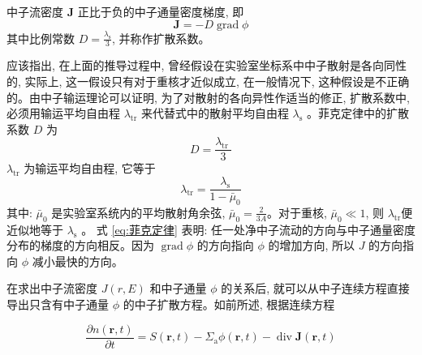 \documentclass{Sichuan Normal University}
\begin{document}
\begin{theorem}[菲克定律]
    中子流密度 $\boldsymbol{J}$ 正比于负的中子通量密度梯度, 即
    \begin{equation}
    \boldsymbol{J}=-D \operatorname{grad} \phi
    \label{eq:菲克定律}
\end{equation}
    其中比例常数 $D=\frac{\lambda_{\mathrm{s}}}{3}$, 并称作扩散系数。
\end{theorem}

应该指出, 在上面的推导过程中, 曾经假设在实验室坐标系中中子散射是各向同性的, 实际上, 这一假设只有对于重核才近似成立, 在一般情况下, 这种假设是不正确的。由中子输运理论可以证明, 为了对散射的各向异性作适当的修正, 扩散系数中, 必须用输运平均自由程 $\lambda_{\mathrm{tr}}$ 来代替式中的散射平均自由程 $\lambda_{\mathrm{s}}$ 。菲克定律中的扩散系数 $D$ 为
\begin{equation}
    D=\frac{\lambda_{\text {tr }}}{3}
    \label{eq:扩散系数}
\end{equation}
    $\lambda_{\mathrm{tr}}$ 为输运平均自由程, 它等于
\begin{equation}
    \lambda_{\mathrm{tr}}=\frac{\lambda_{\mathrm{s}}}{1-\bar{\mu}_0}
    \label{eq:输运平均自由程}
\end{equation}其中: $\bar{\mu}_0$ 是实验室系统内的平均散射角余弦\cite{XieZhongShengHeFanYingDuiWuLiFenXi2020}, $\bar{\mu}_0=\frac{2}{3 A}$。对于重核, $\bar{\mu}_0 \ll 1$, 则 $\lambda_{\mathrm{tr}}$便近似地等于 $\lambda_{\mathrm{s}}$ 。
式 \eqref{eq:菲克定律} 表明: 任一处净中子流动的方向与中子通量密度分布的梯度的方向相反。因为 $\operatorname{grad} \phi$ 的方向指向 $\phi$ 的增加方向, 所以 $J$ 的方向指向 $\phi$ 减小最快的方向。


在求出中子流密度 $J(r, E)$ 和中子通量 $\phi$ 的关系后, 就可以从中子连续方程直接导出只含有中子通量 $\phi$ 的中子扩散方程。如前所述, 根据连续方程

\begin{equation}
    \frac{\partial n(\boldsymbol{r}, t)}{\partial t}=S(\boldsymbol{r}, t)-\Sigma_{\mathrm{a}} \phi(\boldsymbol{r}, t)-\operatorname{div} \boldsymbol{J}(\boldsymbol{r}, t)
\end{equation}
\end{document}
